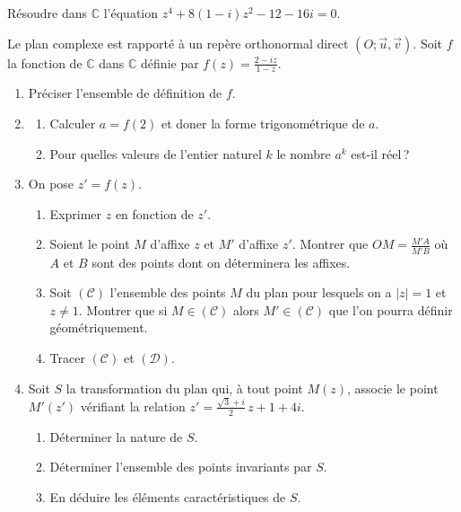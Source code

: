 %
\begin{exo}
	R\'esoudre dans $\mathbb{C}$ l'\'equation $z^4 + 8(1-i) z^2 - 12 - 16 i = 0$.
\end{exo}
\begin{exo}
      Le plan complexe est rapporté à un repère orthonormal direct $(O ; \vec{u} , \vec{v})$.
      Soit $f$ la fonction de $\mathbb{C}$ dans $\mathbb{C}$ définie par 
            $f(z) = \frac{2 - i z}{1-z}$.
      \begin{enumerate}
            \item Pr\'eciser l'ensemble de d\'efinition de $f$.
            \item \begin{enumerate}
                        \item Calculer $a = f(2)$ et doner la forme trigonom\'etrique de $a$.
                        \item Pour quelles valeurs de l'entier naturel $k$ le nombre $a^k$ est-il r\'eel\,?
                  \end{enumerate}
            \item On pose $z' = f(z)$.
                  \begin{enumerate}
                        \item Exprimer $z$ en fonction de $z'$.
                        \item Soient le point $M$ d'affixe $z$ et $M'$ d'affixe $z'$.
                              Montrer que $OM = \frac{M'A}{M'B}$
                              o\`u $A$ et $B$ sont des points dont on d\'eterminera les affixes.
                        \item Soit $(\mathscr{C})$ l'ensemble des points $M$ du plan pour lesquels on a 
                              $|z| = 1$ et $z \neq 1$.
                              Montrer que si $M \in (\mathscr{C})$ alors $M' \in (\mathscr{C})$ que l'on pourra
                              d\'efinir g\'eom\'etriquement.
                        \item Tracer $(\mathscr{C})$ et $(\mathscr{D})$.
                  \end{enumerate}
            \item Soit $S$ la transformation du plan qui, \`a tout point $M(z)$, associe le point $M'(z')$
                  v\'erifiant la relation $z' = \frac{\sqrt{3} + i}{2} \, z + 1 + 4 i $.
                  \begin{enumerate}
                        \item D\'eterminer la nature de $S$.
                        \item D\'eterminer l'ensemble des points invariants par $S$.
                        \item En d\'eduire les \'el\'ements caract\'eristiques de $S$.
                  \end{enumerate}
      \end{enumerate}
\end{exo}






